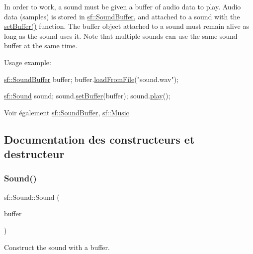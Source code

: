 In order to work, a sound must be given a buffer of audio data to play. Audio data (samples) is stored in \hyperlink{classsf_1_1SoundBuffer}{sf\+::\+Sound\+Buffer}, and attached to a sound with the \hyperlink{classsf_1_1Sound_a8b395e9713d0efa48a18628c8ec1972e}{set\+Buffer()} function. The buffer object attached to a sound must remain alive as long as the sound uses it. Note that multiple sounds can use the same sound buffer at the same time.

Usage example\+: 
\begin{DoxyCode}
\hyperlink{classsf_1_1SoundBuffer}{sf::SoundBuffer} buffer;
buffer.\hyperlink{classsf_1_1SoundBuffer_a2be6a8025c97eb622a7dff6cf2594394}{loadFromFile}(\textcolor{stringliteral}{"sound.wav"});

\hyperlink{classsf_1_1Sound}{sf::Sound} sound;
sound.\hyperlink{classsf_1_1Sound_a8b395e9713d0efa48a18628c8ec1972e}{setBuffer}(buffer);
sound.\hyperlink{classsf_1_1Sound_a2953ffe632536e72e696fd880ced2532}{play}();
\end{DoxyCode}


\begin{DoxySeeAlso}{Voir également}
\hyperlink{classsf_1_1SoundBuffer}{sf\+::\+Sound\+Buffer}, \hyperlink{classsf_1_1Music}{sf\+::\+Music} 
\end{DoxySeeAlso}


\subsection{Documentation des constructeurs et destructeur}
\mbox{\label{classsf_1_1Sound_a3b1cfc19a856d4ff8c079ee41bb78e69}} 
\subsubsection{\texorpdfstring{Sound()}{Sound()}\hspace{0.1cm}{\footnotesize\ttfamily [1/2]}}
{\footnotesize\ttfamily sf\+::\+Sound\+::\+Sound (\begin{DoxyParamCaption}\item[{const \hyperlink{classsf_1_1SoundBuffer}{Sound\+Buffer} \&}]{buffer }\end{DoxyParamCaption})\hspace{0.3cm}{\ttfamily [explicit]}}



Construct the sound with a buffer. 


